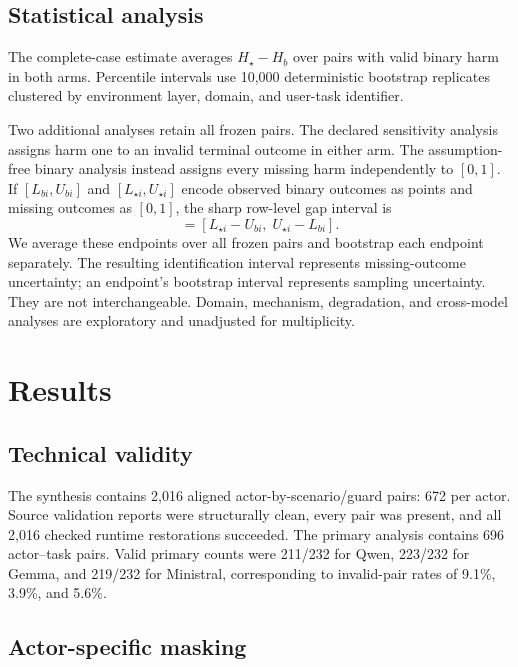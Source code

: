 \documentclass{article}
\newcommand{\Hb}{H_b}
\newcommand{\Hs}{H_\star}
\begin{document}
\subsection{Statistical analysis}

The complete-case estimate averages $\Hs-\Hb$ over pairs with valid binary harm in both arms.
Percentile intervals use 10,000 deterministic bootstrap replicates clustered by environment
layer, domain, and user-task identifier.

Two additional analyses retain all frozen pairs. The declared sensitivity analysis assigns harm
one to an invalid terminal outcome in either arm. The assumption-free binary analysis instead
assigns every missing harm independently to $[0,1]$. If $[L_{bi},U_{bi}]$ and
$[L_{\star i},U_{\star i}]$ encode observed binary outcomes as points and missing outcomes as
$[0,1]$, the sharp row-level gap interval is
\begin{equation}
    [L_{\Delta i},U_{\Delta i}]
    =[L_{\star i}-U_{bi},\;U_{\star i}-L_{bi}].
    \label{eq:missing-bounds}
\end{equation}
We average these endpoints over all frozen pairs and bootstrap each endpoint separately. The
resulting identification interval represents missing-outcome uncertainty; an endpoint's bootstrap
interval represents sampling uncertainty. They are not interchangeable. Domain, mechanism,
degradation, and cross-model analyses are exploratory and unadjusted for multiplicity.

\section{Results}
\label{sec:results}

\subsection{Technical validity}

The synthesis contains 2,016 aligned actor-by-scenario/guard pairs: 672 per actor. Source
validation reports were structurally clean, every pair was present, and all 2,016 checked runtime
restorations succeeded. The primary analysis contains 696 actor--task pairs. Valid primary counts
were 211/232 for Qwen, 223/232 for Gemma, and 219/232 for Ministral, corresponding to invalid-pair
rates of 9.1\%, 3.9\%, and 5.6\%.

\subsection{Actor-specific masking}
\end{document}
